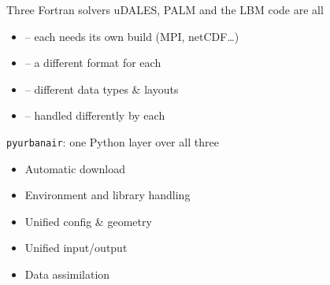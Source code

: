 \documentclass[aspectratio=169,11pt]{beamer}
\begin{document}

\begin{frame}{Three Fortran solvers}
      uDALES, PALM and the LBM code are all 
      \medskip
      \begin{itemize}\setlength\itemsep{8pt}
        \item {} -- each needs its own
              build (MPI, netCDF\dots)
        \item {} -- a different format for each
        \item {} -- different data types \& layouts
        \item {} -- handled differently by each
      \end{itemize}
\end{frame}

\begin{frame}{\texttt{pyurbanair}: one Python layer over all three}
  \begin{itemize}\setlength\itemsep{8pt}
    \item Automatic download
    \item Environment and library handling
    \item Unified config \& geometry
    \item Unified input/output
    \item Data assimilation
  \end{itemize}
\end{frame}
\end{document}
